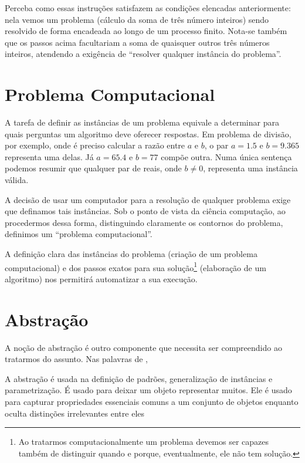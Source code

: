 Perceba como essas instruções satisfazem as condições elencadas anteriormente: nela vemos um problema (cálculo da soma de três número inteiros) sendo resolvido de forma encadeada ao longo de um processo finito. Nota-se também que os passos acima facultariam a soma de quaisquer outros três números inteiros, atendendo a exigência de ``resolver qualquer instância do problema''. 


\section{Problema Computacional}

A tarefa de definir as instâncias de um problema equivale a determinar para quais perguntas um algoritmo deve oferecer respostas. Em problema de divisão, por exemplo, onde é preciso calcular a razão entre $a$ e $b$, o par $a=1.5$ e $b=9.365$ representa uma delas. Já $a=65.4$ e $b=77$ compõe outra. Numa única sentença podemos resumir que qualquer par de reais, onde $b\neq0$, representa uma instância válida. 

A decisão de usar um computador para a resolução de qualquer problema exige que definamos tais instâncias. Sob o ponto de vista da ciência computação, ao procedermos dessa forma, distinguindo claramente os contornos do problema, definimos um ``problema computacional''.  


A definição clara das instâncias do problema (criação de um problema computacional) e dos passos exatos para sua solução\footnote{Ao tratarmos computacionalmente um problema devemos ser capazes também de distinguir quando e porque, eventualmente, ele não tem solução.} (elaboração de um algoritmo) nos permitirá automatizar a sua execução. 


\section{Abstração}

A noção de abstração é outro componente que necessita ser compreendido ao tratarmos do assunto. Nas palavras de ,

\begin{citacao}
A abstração é usada na definição de padrões, generalização de instâncias e parametrização. É usado para deixar um objeto representar muitos. Ele é usado para capturar propriedades essenciais comuns a um conjunto de objetos enquanto oculta distinções irrelevantes entre eles \cite[p.~1. Tradução nossa]{wing2006}
\end{citacao}

